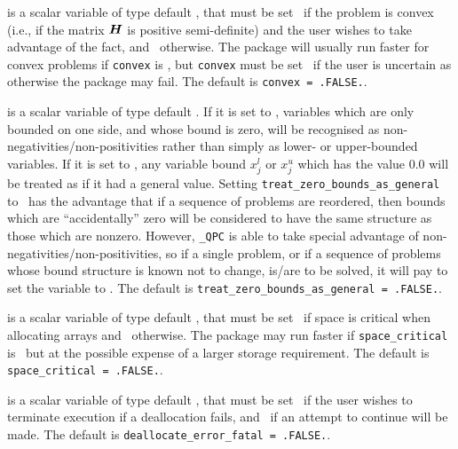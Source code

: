 \documentclass{galahad}
\newcommand{\packagename}{QPC}
\newcommand{\fullpackagename}{\libraryname\_\packagename}
\begin{document}
\begin{description}
 is a scalar variable of type default \logical, 
that must be set \true\ if the problem is convex (i.e., if the matrix
${\bm{H}}$ is positive semi-definite) and 
the user wishes to take advantage of the fact,
and  \false\ otherwise. The package will usually run faster for
convex problems if {\tt convex} is \true, but {\tt convex} 
must be set \false\ if the user is uncertain as otherwise the
package may fail. The default is {\tt convex = .FALSE.}.

 is a scalar variable of type 
default \logical.
If it is set to \false, variables which 
are only bounded on one side, and whose bound is zero,
will be recognised as non-negativities/non-positivities rather than simply as
lower- or upper-bounded variables.
If it is set to \true, any variable bound 
$x_{j}^{l}$ or $x_{j}^{u}$ which has the value 0.0 will be
treated as if it had a general value.
Setting {\tt treat\_zero\_bounds\_as\_general} to \true\ has the advantage
that if a sequence of problems are reordered, then bounds which are
``accidentally'' zero will be considered to have the same structure as
those which are nonzero. However, {\tt \fullpackagename} is
able to take special advantage of non-negativities/non-positivities, so
if a single problem, or if a sequence of problems whose 
bound structure is known not to change, is/are to be solved, 
it will pay to set the variable to \false.
The default is {\tt treat\_zero\_bounds\_as\_general = .FALSE.}.


 is a scalar variable of type default \logical, 
that must be set \true\ if space is critical when allocating arrays
and  \false\ otherwise. The package may run faster if 
{\tt space\_critical} is \false\ but at the possible expense of a larger
storage requirement. The default is {\tt space\_critical = .FALSE.}.

 is a scalar variable of type default \logical, 
that must be set \true\ if the user wishes to terminate execution if
a deallocation  fails, and \false\ if an attempt to continue
will be made. The default is {\tt deallocate\_error\_fatal = .FALSE.}.


\end{description}
\end{document}
